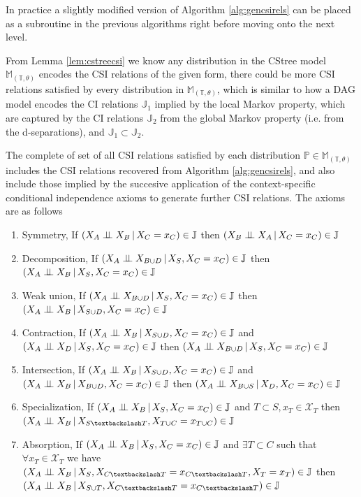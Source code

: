 \documentclass{tufte-book}
\begin{document}
In practice a slightly modified version of Algorithm \ref{alg:gencsirels} can be placed as a subroutine in the previous algorithms right before moving onto the next level.


From Lemma \ref{lem:cstreecsi} we know any distribution in the CStree model \(\mathbb{M}_{(\mathbb{T},\theta)}\) encodes the CSI relations of the given form, there could be more CSI relations satisfied by every distribution in \(\mathbb{M}_{(\mathbb{T},\theta)}\), which is similar to how a DAG model encodes the CI relations \(\mathbb{J}_1\) implied by the local Markov property, which are captured by the CI relations \(\mathbb{J}_2\) from the global Markov property (i.e. from the d-separations), and \(\mathbb{J}_1 \subset \mathbb{J}_2\).


The complete of set of all CSI relations satisfied by each distribution \(\mathbb{P} \in \mathbb{M}_{(\mathbb{T},\theta)}\) includes the CSI relations recovered from Algorithm \ref{alg:gencsirels}, and also include those implied by the succesive application of the context-specific conditional independence axioms to generate further CSI relations. The axioms are as follows


\begin{enumerate}
\item Symmetry, If \((X_A \perp \!\!\! \perp X_B \,|\, X_C=x_C) \in \mathbb{J}\) then \((X_B \perp \!\!\! \perp X_A \,|\, X_C=x_C) \in \mathbb{J}\)
\item Decomposition, If \((X_A \perp \!\!\! \perp X_{B \cup D} \,|\, X_S, X_C=x_C) \in \mathbb{J}\) then \((X_A \perp \!\!\! \perp X_B \,|\, X_S, X_C=x_C) \in \mathbb{J}\)
\item Weak union, If \((X_A \perp \!\!\! \perp X_{B \cup D} \,|\, X_S, X_C=x_C) \in \mathbb{J}\) then \((X_A \perp \!\!\! \perp X_{B} \,|\, X_{S \cup D}, X_C=x_C) \in \mathbb{J}\)
\item Contraction, If \((X_A \perp \!\!\! \perp X_B \,|\, X_{S \cup D}, X_C=x_C) \in \mathbb{J}\) and \((X_A \perp \!\!\! \perp X_D \,|\,X_S, X_C=x_C) \in \mathbb{J}\) then \((X_A \perp \!\!\! \perp X_{B \cup D} \,|\, X_S, X_C=x_C) \in \mathbb{J}\)
\item Intersection,  If \((X_A \perp \!\!\! \perp X_B \,|\, X_{S \cup D}, X_C=x_C) \in \mathbb{J}\) and  \((X_A \perp \!\!\! \perp X_B \,|\, X_{B \cup D}, X_C=x_C) \in \mathbb{J}\) then  \((X_A \perp \!\!\! \perp X_{B \cup S} \,|\, X_D, X_C=x_C) \in \mathbb{J}\)
\item Specialization, If \((X_A \perp \!\!\! \perp X_B \,|\, X_S, X_C=x_C) \in \mathbb{J}\) and \(T \subset S, x_T \in \mathcal{X}_T\) then \((X_A \indep X_B \,|\, X_{S \textbackslash T}, X_{T \cup C} = x_{T \cup C}) \in \mathbb{J}\)
\item Absorption, If \((X_A \perp \!\!\! \perp X_B \,|\, X_S, X_C=x_C) \in \mathbb{J}\) and \(\exists T \subset C\) such that \(\forall x_T \in \mathcal{X}_T\) we have \((X_A \indep X_B \,|\, X_S, X_{C\textbackslash T}=x_{C \textbackslash T}, X_T=x_T) \in \mathbb{J}\) then \((X_A \indep X_B \,|\, X_{S \cup T}, X_{C \textbackslash T}=x_{C \textbackslash T}) \in \mathbb{J}\)
\end{enumerate}
\end{document}
